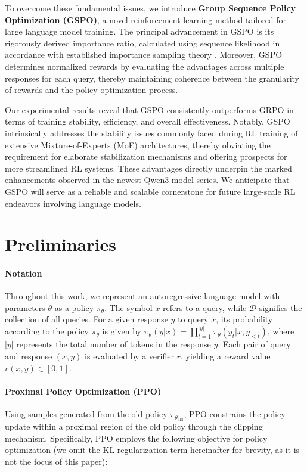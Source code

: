 To overcome these fundamental issues, we introduce \textbf{Group Sequence Policy Optimization (GSPO)}, a novel reinforcement learning method tailored for large language model training. The principal advancement in GSPO is its rigorously derived importance ratio, calculated using sequence likelihood in accordance with established importance sampling theory \citep{click}. Moreover, GSPO determines normalized rewards by evaluating the advantages across multiple responses for each query, thereby maintaining coherence between the granularity of rewards and the policy optimization process.

Our experimental results reveal that GSPO consistently outperforms GRPO in terms of training stability, efficiency, and overall effectiveness. Notably, GSPO intrinsically addresses the stability issues commonly faced during RL training of extensive Mixture-of-Experts (MoE) architectures, thereby obviating the requirement for elaborate stabilization mechanisms and offering prospects for more streamlined RL systems. These advantages directly underpin the marked enhancements observed in the newest Qwen3 model series. We anticipate that GSPO will serve as a reliable and scalable cornerstone for future large-scale RL endeavors involving language models.

\section{Preliminaries}

\paragraph{Notation}
Throughout this work, we represent an autoregressive language model with parameters $\theta$ as a policy $\pi_\theta$. The symbol $x$ refers to a query, while $\mathcal{D}$ signifies the collection of all queries. For a given response $y$ to query $x$, its probability according to the policy $\pi_\theta$ is given by $\pi_\theta (y | x)=\prod_{t=1}^{|y|} \pi_\theta (y_t | x, y_{<t} )$, where $|y|$ represents the total number of tokens in the response $y$. Each pair of query and response $(x, y)$ is evaluated by a verifier $r$, yielding a reward value $r(x, y) \in [ 0, 1 ]$.

\paragraph{Proximal Policy Optimization (PPO)} Using samples generated from the old policy $\pi_{\theta_\text{old}}$, PPO \citep{ppo} constrains the policy update within a proximal region of the old policy through the clipping mechanism. Specifically, PPO employs the following objective for policy optimization (we omit the KL regularization term hereinafter for brevity, as it is not the focus of this paper):

